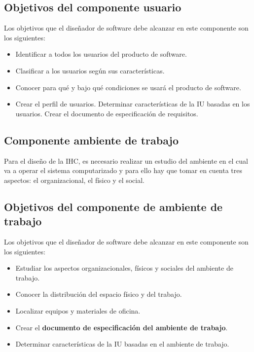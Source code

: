 \documentclass[11pt]{article}
\begin{document}
\subsection{Objetivos del componente usuario}
\label{sec:org314102f}
\autocite{narciso_valero_2008} Los objetivos que el diseñador de software 
debe alcanzar en este componente son los siguientes: 

\begin{itemize}
\item Identificar a todos los usuarios del producto de software.
\item Clasificar a los usuarios según sus características.
\item Conocer para qué y bajo qué condiciones se usará el producto de software.
\item Crear el perfil de usuarios. Determinar características de la IU basadas en los usuarios. Crear el documento de especificación de requisitos.
\end{itemize}


\subsection{Componente ambiente de trabajo}
\label{sec:org1551d75}
\autocite{narciso_valero_2008} Para el diseño de la IHC, es necesario 
realizar un estudio del ambiente en el cual va a operar el sistema 
computarizado y para ello hay que tomar en cuenta tres aspectos: el 
organizacional, el físico y el social. 

\subsection{Objetivos del componente de ambiente de trabajo}
\label{sec:org080f1fd}
\autocite{narciso_valero_2008} Los objetivos que el diseñador de software
debe alcanzar en este componente son los siguientes: 

\begin{itemize}
\item Estudiar los aspectos organizacionales, físicos y sociales del ambiente de trabajo.
\item Conocer la distribución del espacio físico y del trabajo.
\item Localizar equipos y materiales de oficina.
\item Crear el \textbf{documento de especificación del ambiente de trabajo}.
\item Determinar características de la IU basadas en el ambiente de trabajo.
\end{itemize}
\end{document}
